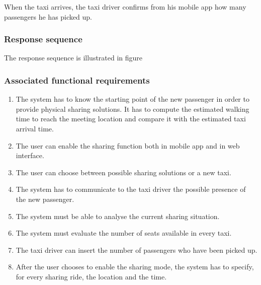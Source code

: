  When the taxi arrives, the taxi driver confirms from his mobile app how many passengers he has picked up.
 
 \subsubsection{Response sequence}
 The response sequence is illustrated in figure
 
 \subsubsection{Associated functional requirements}
 \begin{enumerate}
 \item The system has to know the starting point of the new passenger in order to provide physical sharing solutions. It has to compute the estimated walking time to reach the meeting location and compare it with the estimated taxi arrival time.
 \item The user can enable the sharing function both in mobile app and in web interface.
 \item The user can choose between possible sharing solutions or a new taxi.
 \item The system has to communicate to the taxi driver the possible presence of the new passenger.
 \item The system must be able to analyse the current sharing situation.
 \item The system must evaluate the number of seats available in every taxi.
 \item The taxi driver can insert the number of passengers who have been picked up.
 \item After the user chooses to enable the sharing mode, the system has to specify, for every sharing ride, the location and the time.
 \end{enumerate}